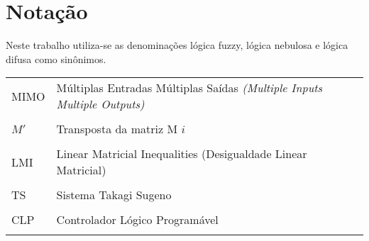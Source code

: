 %

\chapter*{Notação}

Neste trabalho utiliza-se as denominações lógica fuzzy, lógica nebulosa e lógica difusa como sinônimos.

\begin{tabular}{>{\centering}p{}l}
	MIMO & Múltiplas Entradas Múltiplas Saídas \textit{(Multiple Inputs Multiple Outputs)} \\ \tabularnewline
	$M'$ & Transposta da matriz M $i$ \\\tabularnewline
	LMI & Linear Matricial Inequalities (Desigualdade Linear Matricial) \\ \tabularnewline
	TS & Sistema Takagi Sugeno \\ \tabularnewline
	CLP & Controlador Lógico Programável \\	\tabularnewline
\end{tabular}



